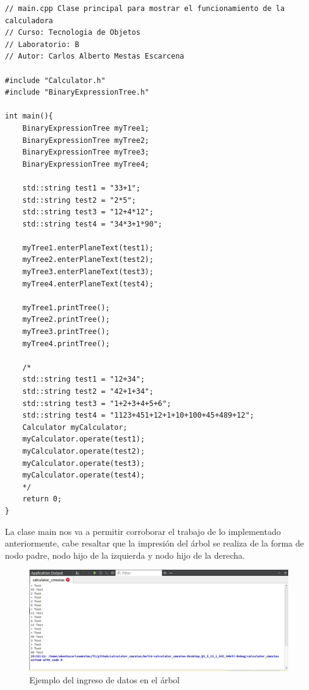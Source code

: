 \documentclass[a4paper,12pt]{article}
\begin{document}
\begin{verbatim} 
// main.cpp Clase principal para mostrar el funcionamiento de la calculadora
// Curso: Tecnologia de Objetos
// Laboratorio: B
// Autor: Carlos Alberto Mestas Escarcena

#include "Calculator.h"
#include "BinaryExpressionTree.h"

int main(){
    BinaryExpressionTree myTree1;
    BinaryExpressionTree myTree2;
    BinaryExpressionTree myTree3;
    BinaryExpressionTree myTree4;

    std::string test1 = "33+1";
    std::string test2 = "2*5";
    std::string test3 = "12+4*12";
    std::string test4 = "34*3+1*90";

    myTree1.enterPlaneText(test1);
    myTree2.enterPlaneText(test2);
    myTree3.enterPlaneText(test3);
    myTree4.enterPlaneText(test4);

    myTree1.printTree();
    myTree2.printTree();
    myTree3.printTree();
    myTree4.printTree();

    /*
    std::string test1 = "12+34";
    std::string test2 = "42+1+34";
    std::string test3 = "1+2+3+4+5+6";
    std::string test4 = "1123+451+12+1+10+100+45+489+12";
    Calculator myCalculator;
    myCalculator.operate(test1);
    myCalculator.operate(test2);
    myCalculator.operate(test3);
    myCalculator.operate(test4);
    */
    return 0;
}
\end{verbatim} 

La clase main nos va a permitir corroborar el trabajo de lo implementado anteriormente, cabe resaltar que la impresión del árbol se realiza de la forma de nodo padre, nodo hijo de la izquierda y nodo hijo de la derecha.


\begin{figure}[h]
    \centering
    \includegraphics[width=1\textwidth]{screen2.png}
    \caption{Ejemplo del ingreso de datos en el árbol}
\end{figure}

\clearpage
\newpage
\end{document}
